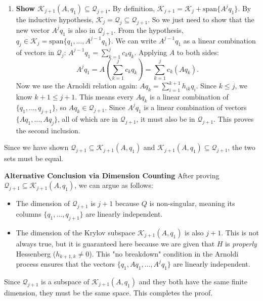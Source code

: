\begin{solution}
\begin{enumerate}
    \item[($\supseteq$)] \textbf{Show $\mathcal{K}_{j+1}(A, q_1) \subseteq \mathcal{Q}_{j+1}$.}
    By definition, $\mathcal{K}_{j+1} = \mathcal{K}_j + \mathrm{span}\{A^j q_1\}$.
    By the inductive hypothesis, $\mathcal{K}_j = \mathcal{Q}_j \subseteq \mathcal{Q}_{j+1}$. So we just need to show that the new vector $A^j q_1$ is also in $\mathcal{Q}_{j+1}$.
    From the hypothesis, $q_j \in \mathcal{K}_j = \mathrm{span}\{q_1, \dots, A^{j-1}q_1\}$. We can write $A^{j-1}q_1$ as a linear combination of vectors in $\mathcal{Q}_j$: $A^{j-1}q_1 = \sum_{k=1}^j c_k q_k$.
    Applying $A$ to both sides:
    \[ A^j q_1 = A \left( \sum_{k=1}^j c_k q_k \right) = \sum_{k=1}^j c_k (A q_k). \]
    Now we use the Arnoldi relation again: $Aq_k = \sum_{i=1}^{k+1} h_{ik} q_i$. Since $k \le j$, we know $k+1 \le j+1$. This means every $Aq_k$ is a linear combination of $\{q_1, \dots, q_{j+1}\}$, so $Aq_k \in \mathcal{Q}_{j+1}$.
    Since $A^j q_1$ is a linear combination of vectors $\{Aq_1, \dots, Aq_j\}$, all of which are in $\mathcal{Q}_{j+1}$, it must also be in $\mathcal{Q}_{j+1}$. This proves the second inclusion.
\end{enumerate}

Since we have shown $\mathcal{Q}_{j+1} \subseteq \mathcal{K}_{j+1}(A, q_1)$ and $\mathcal{K}_{j+1}(A, q_1) \subseteq \mathcal{Q}_{j+1}$, the two sets must be equal.

\textbf{Alternative Conclusion via Dimension Counting}
After proving $\mathcal{Q}_{j+1} \subseteq \mathcal{K}_{j+1}(A, q_1)$, we can argue as follows:
\begin{itemize}
    \item The dimension of $\mathcal{Q}_{j+1}$ is $j+1$ because $Q$ is non-singular, meaning its columns $\{q_1, \dots, q_{j+1}\}$ are linearly independent.
    \item The dimension of the Krylov subspace $\mathcal{K}_{j+1}(A, q_1)$ is also $j+1$. This is not always true, but it is guaranteed here because we are given that $H$ is \textit{properly} Hessenberg ($h_{k+1,k} \neq 0$). This "no breakdown" condition in the Arnoldi process ensures that the vectors $\{q_1, Aq_1, \dots, A^j q_1\}$ are linearly independent.
\end{itemize}
Since $\mathcal{Q}_{j+1}$ is a subspace of $\mathcal{K}_{j+1}(A, q_1)$ and they both have the same finite dimension, they must be the same space. This completes the proof.
\end{solution}

